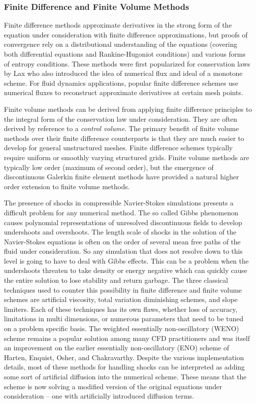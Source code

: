 \documentclass[Proposal.tex]{subfiles}
\begin{document}
\subsubsection{Finite Difference and Finite Volume Methods}
Finite difference methods approximate derivatives in the strong form of the equation under consideration with finite difference approximations, 
but proofs of convergence rely on a distributional understanding of the equations (covering both differential equations and Rankine-Hugoniot conditions) 
and various forms of entropy conditions.
These methods were first popularized for conservation laws by Lax who also introduced the idea of numerical flux and ideal of a monotone scheme.
For fluid dynamics applications, popular finite difference schemes use numerical fluxes to reconstruct approximate derivatives at certain mesh points.

Finite volume methods can be derived from applying finite difference principles to the integral form of the conservation law under consideration.
They are often derived by reference to a \emph{control volume}. 
The primary benefit of finite volume methods over their finite difference counterparts is that they are much easier to develop for general unstructured meshes.
Finite difference schemes typically require uniform or smoothly varying structured grids.
Finite volume methods are typically low order (maximum of second order), but the emergence of discontinuous Galerkin finite element methods
have provided a natural higher order extension to finite volume methods.

The presence of shocks in compressible Navier-Stokes simulations presents a difficult problem for any numerical method.
The so called Gibbs phenomenon causes polynomial representations of unresolved discontinuous fields to develop undershoots and overshoots.
The length scale of shocks in the solution of the Navier-Stokes equations is often on the order of several mean free paths of the fluid under consideration.
So any simulation that does not resolve down to this level is going to have to deal with Gibbs effects.
This can be a problem when the undershoots threaten to take density or energy negative which can quickly cause the entire solution to
lose stability and return garbage.
The three classical techniques used to counter this possibility in finite difference and finite volume schemes are artificial viscosity, 
total variation diminishing schemes, and slope limiters.
Each of these techniques has its own flaws, whether loss of accuracy, limitations in multi dimensions, or numerous parameters that need 
to be tuned on a problem specific basis.
The weighted essentially non-oscillatory (WENO) scheme\cite{WENO} remains a popular solution among many CFD practitioners and was itself an improvement
on the earlier essentially non-oscillatory (ENO) scheme of Harten, Enquist, Osher, and Chakravarthy\cite{ENO}.
Despite the various implementation details, most of these methods for handling shocks can be interpreted as adding some sort of artificial diffusion
into the numerical scheme.
These means that the scheme is now solving a modified version of the original equations under consideration 
-- one with artificially introduced diffusion terms.
\end{document}

